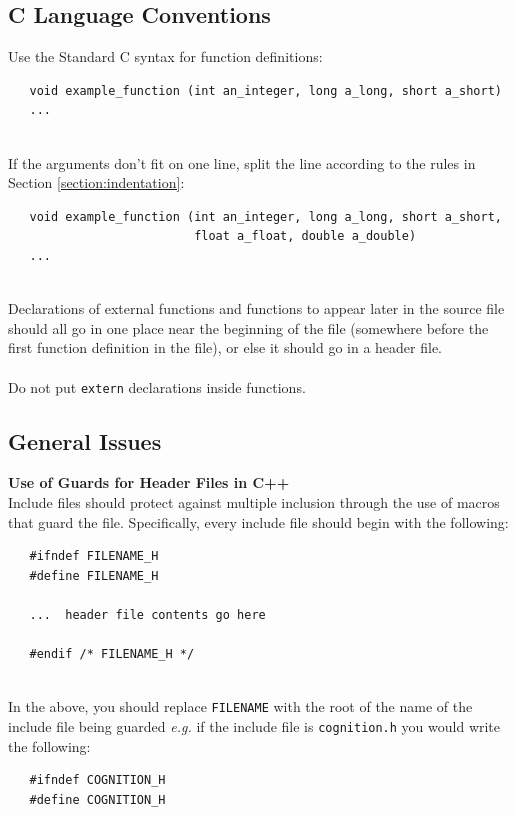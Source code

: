 \documentclass{CSSRforAfrica}
\newcommand{\blank}{~\\}
\begin{document}
\begin{appendices}
\subsection{C Language Conventions}

\label{section:c_conventions}

Use the Standard C syntax for function definitions:
{\small
\begin{verbatim}
   void example_function (int an_integer, long a_long, short a_short)
   ...
\end{verbatim}
}
\blank
If the arguments don't fit on one line, split the line according to the rules in 
Section \ref{section:indentation}:
{\small
\begin{verbatim}
   void example_function (int an_integer, long a_long, short a_short,
                          float a_float, double a_double)
   ...
\end{verbatim}
}
\blank
Declarations of external functions and functions to appear later in the source file
should all go in one place near the beginning of the file (somewhere before the first
function definition in the file), or else it should go in a header file.
\blank
~
\blank
Do not put {\small \verb+extern+} declarations inside functions.



\subsection{General Issues}

{\bf Use of Guards for Header Files in C++}\\
Include files should protect against multiple inclusion through the use of macros 
that guard the file.  Specifically, every include file should begin with the following:
{\small
\begin{verbatim}
   #ifndef FILENAME_H
   #define FILENAME_H

   ...  header file contents go here

   #endif /* FILENAME_H */
\end{verbatim}
}
\blank
In the above, you should replace {\small \verb+FILENAME+} with the root of the
name of the include file being guarded {\em e.g.} if the include file is
{\small \verb+cognition.h+} you would write the following:
{\small
\begin{verbatim}
   #ifndef COGNITION_H
   #define COGNITION_H


\end{verbatim}}
\end{appendices}
\end{document}

